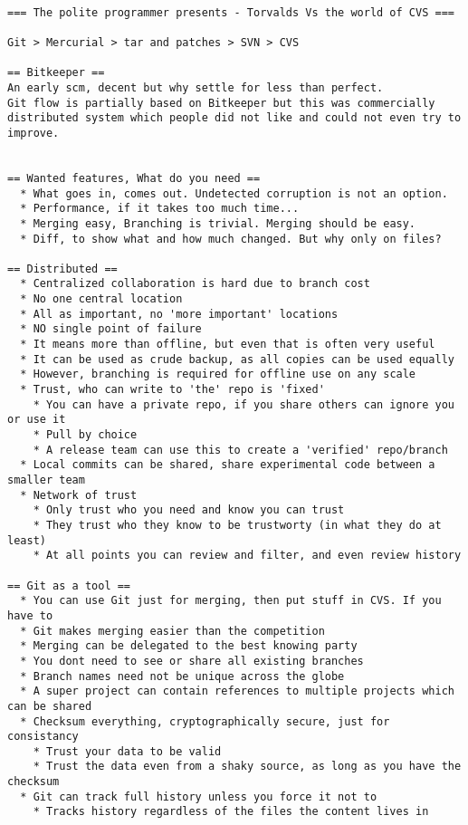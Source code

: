 \begin{verbatim}

=== The polite programmer presents - Torvalds Vs the world of CVS ===

Git > Mercurial > tar and patches > SVN > CVS

== Bitkeeper ==
An early scm, decent but why settle for less than perfect.
Git flow is partially based on Bitkeeper but this was commercially distributed system which people did not like and could not even try to improve.


== Wanted features, What do you need ==
  * What goes in, comes out. Undetected corruption is not an option.
  * Performance, if it takes too much time...
  * Merging easy, Branching is trivial. Merging should be easy.
  * Diff, to show what and how much changed. But why only on files?

== Distributed ==
  * Centralized collaboration is hard due to branch cost
  * No one central location
  * All as important, no 'more important' locations
  * NO single point of failure
  * It means more than offline, but even that is often very useful
  * It can be used as crude backup, as all copies can be used equally
  * However, branching is required for offline use on any scale
  * Trust, who can write to 'the' repo is 'fixed'
    * You can have a private repo, if you share others can ignore you or use it
    * Pull by choice
    * A release team can use this to create a 'verified' repo/branch 
  * Local commits can be shared, share experimental code between a smaller team
  * Network of trust
    * Only trust who you need and know you can trust
    * They trust who they know to be trustworty (in what they do at least)
    * At all points you can review and filter, and even review history

== Git as a tool ==
  * You can use Git just for merging, then put stuff in CVS. If you have to
  * Git makes merging easier than the competition
  * Merging can be delegated to the best knowing party
  * You dont need to see or share all existing branches
  * Branch names need not be unique across the globe
  * A super project can contain references to multiple projects which can be shared
  * Checksum everything, cryptographically secure, just for consistancy
    * Trust your data to be valid
    * Trust the data even from a shaky source, as long as you have the checksum
  * Git can track full history unless you force it not to
    * Tracks history regardless of the files the content lives in




\end{verbatim}
